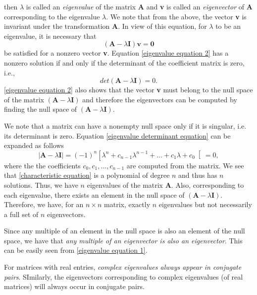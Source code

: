 \documentclass[conference,12pt,onecolumn,compsoc]{IEEEtran}
\begin{document}
then $\lambda$ is called an \emph{eigenvalue} of the matrix \textbf{A} and \textbf{v} is called an \emph{eigenvector} of \textbf{A} corresponding to the eigenvalue $\lambda$. We note that from the above, the vector \textbf{v} is invariant under the transformation \textbf{A}. In view of this equation, for $\lambda$ to be an eigenvalue, it is necessary that
\begin{equation}
(\textbf{A} - \lambda\textbf{I})\textbf{v} = \textbf{0}
\label{eigenvalue equation 2}
\end{equation}
be satisfied for a nonzero vector \textbf{v}. Equation \eqref{eigenvalue equation 2} has a nonzero solution if and only if the determinant of the coefficient matrix is zero, i.e.,
\begin{equation}
det(\textbf{A} - \lambda\textbf{I})= 0.
\label{eigenvalue determinant equation}
\end{equation}\eqref{eigenvalue equation 2} also shows that the vector \textbf{v} must belong to the null space of the matrix $(\textbf{A}-\lambda\textbf{I})$ and therefore the eigenvectors can be computed by finding the null space of $(\textbf{A}-\lambda\textbf{I})$. 

We note that a matrix can have a nonempty null space only if it is singular, i.e. its determinant is zero. Equation \eqref{eigenvalue determinant equation} can be expanded as follows
\begin{equation}
|\textbf{A}-\lambda\textbf{I}| = (-1)^n\left[ \lambda^n+c_{n-1}\lambda^{n-1} + ... + c_1\lambda + c_0\right[ = 0,
\label{characteristic equation}
\end{equation}
where the the coefficients $c_0, c_1, ..., c_{n-1}$ are computed from the matrix. We see that \eqref{characteristic equation} is a polynomial of degree $n$ and thus has $n$ solutions. Thus, we have $n$ eigenvalues of the matrix \textbf{A}. Also, corresponding to each eigenvalue, there exists an element in the null space of $(\textbf{A}-\lambda\textbf{I})$. Therefore, we have, for an $n \times n$ matrix, exactly $n$ eigenvalues but not necessarily a full set of $n$ eigenvectors. 

Since any multiple of an element in the null space is also an element of the null space, we have that \emph{any multiple of an eigenvector is also an eigenvector}. This can be easily seen from \eqref{eigenvalue equation 1}.

For matrices with real entries, \emph{complex eigenvalues always appear in conjugate pairs}. SImilarly, the eigenvectors corresponding to complex eigenvalues (of real matrices) will always occur in conjugate pairs. 
\end{document}
